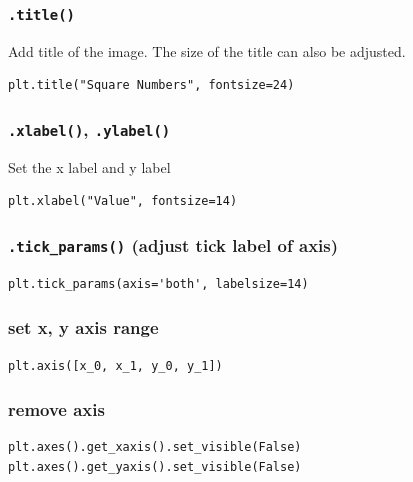 \documentclass[12pt]{book}
\begin{document}
\subsubsection{\texttt{.title()}}
\label{sec:org671497b}
Add title of the image. The size of the title can also be adjusted.
\begin{verbatim}
plt.title("Square Numbers", fontsize=24)
\end{verbatim}

\subsubsection{\texttt{.xlabel()}, \texttt{.ylabel()}}
\label{sec:orgedd714f}
Set the x label and y label
\begin{verbatim}
plt.xlabel("Value", fontsize=14)
\end{verbatim}

\subsubsection{\texttt{.tick\_params()} (adjust tick label of axis)}
\label{sec:org1bb8a63}
\begin{verbatim}
plt.tick_params(axis='both', labelsize=14)
\end{verbatim}

\subsubsection{set x, y axis range}
\label{sec:org8f8f83e}
\begin{verbatim}
plt.axis([x_0, x_1, y_0, y_1])
\end{verbatim}

\subsubsection{remove axis}
\label{sec:orgd8b3c36}
\begin{verbatim}
plt.axes().get_xaxis().set_visible(False)
plt.axes().get_yaxis().set_visible(False)
\end{verbatim}
\end{document}
